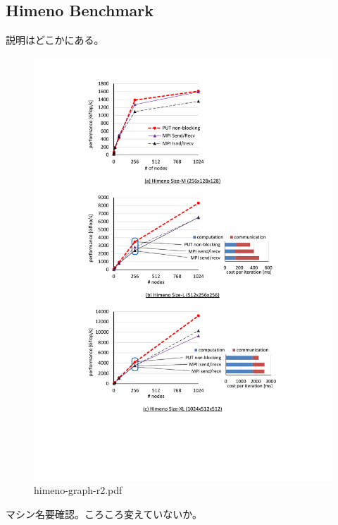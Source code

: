 \subsection{Himeno Benchmark}

説明はどこかにある。

\begin{figure}[p]
  \begin{center}
    \mbox{\includegraphics[trim=37mm 34mm 37mm 4mm, scale=0.8,clip]{figs/himeno-graph-r2.pdf}}
    \caption{himeno-graph-r2.pdf}\label{fig:himeno-graph}
  \end{center}
\end{figure}


マシン名要確認。ころころ変えていないか。






